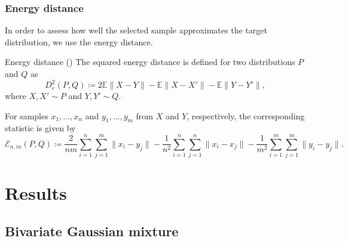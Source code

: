 \documentclass{beamer}
\begin{document}
\begin{frame}
\frametitle{Energy distance}

In order to assess how well the selected sample approximates the target distribution, we use the energy distance.

\begin{block}{Energy distance (\cite{rizzoEnergyDistance2016})}
The squared energy distance is defined for two distributions $P$ and $Q$ as
\begin{equation*}
D^2_e(P, Q) \coloneq 2 \mathbb{E} \|X - Y\| - \mathbb{E}\|X - X'\| - \mathbb{E} \|Y - Y'\|,
\end{equation*}
where $X, X' \sim P$ and $Y, Y' \sim Q$.
\end{block}

For samples $x_1, \dots, x_n$ and $y_1, \dots, y_m$ from $X$ and $Y$, respectively, the corresponding statistic is given by
\begin{equation*}
\mathcal{E}_{n,m}(P, Q) \coloneq \frac{2}{nm}\sum_{i=1}^n \sum_{j=1}^m \|x_i - y_j\| - \frac{1}{n^2} \sum_{i=1}^n\sum_{j=1}^n \|x_i - x_j\| - \frac{1}{m^2} \sum_{i=1}^m \sum_{j=1}^m \|y_i - y_j\|.
\end{equation*}

\end{frame}



\section{Results}

\subsection{Bivariate Gaussian mixture}
\end{document}
